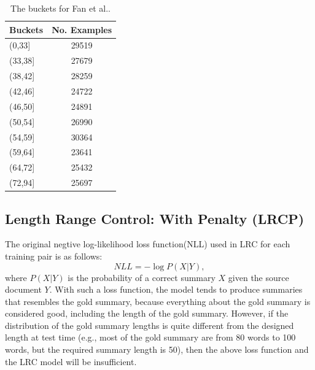 {\begin{table}[t!]
\small
\caption{The buckets for Fan et al.. }
\label{tab:datawithoutpenalty}
\begin{center}
\begin{tabular}{|l|c|}
\hline \bf Buckets & \bf No. Examples\\ \hline
(0,33] & 29519 \\
(33,38] & 27679 \\
(38,42] & 28259 \\
(42,46] & 24722 \\
(46,50] & 24891 \\
(50,54] & 26990 \\
(54,59] & 30364 \\
(59,64] & 23641 \\
(64,72] & 25432 \\
(72,94] & 25697 \\
\hline
\end{tabular}
\end{center}
\end{table}

\subsection{Length Range Control: With Penalty (LRCP)}
The original negtive log-likelihood loss function(NLL) used in LRC
for each training pair is as follows:
\begin{equation}
NLL = -\log P(X|Y),
\end{equation}
where $P(X|Y)$ is the probability of a correct summary $X$ given the
source document $Y$.
With such a loss function, the model tends to produce summaries that
resembles the gold summary, because everything about the gold summary is
considered good, including the length of the gold summary. However, if
the distribution of the gold summary lengths is quite different from
the designed length at test time (e.g., most of the gold summary are from
80 words to 100 words, but the required summary length is 50), then
the above loss function and the LRC model will be insufficient.

}

